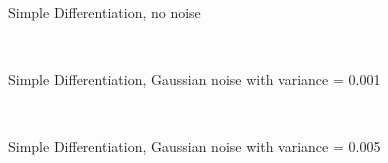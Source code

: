 \begin{figure}
  \centering
     \\
  \caption{Simple Differentiation, no noise}
  \label{fig:sd_no_noise}
\end{figure}

\begin{figure}
  \centering
     \\
  \caption{Simple Differentiation, Gaussian noise with variance = 0.001}
  \label{fig:sd_001}
\end{figure}

\begin{figure}
  \centering
     \\
  \caption{Simple Differentiation, Gaussian noise with variance = 0.005}
  \label{fig:sd_005}
\end{figure}